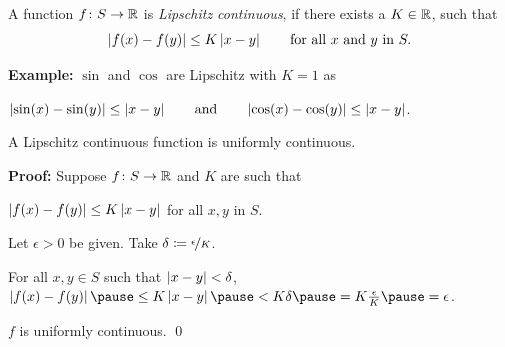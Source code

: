 \documentclass[10pt,aspectratio=169]{beamer}
\begin{document}
\begin{frame}

\begin{definition}
A function $f \colon S \to {\mathbb{R}}$
is \emph{Lipschitz continuous}, if there exists a $K \in {\mathbb{R}}$, such that
\begin{equation*}
\left\lvert {f(x)-f(y)} \right\rvert \leq K \left\lvert {x-y} \right\rvert 
\qquad \text{for all } x \text{ and } y \text{ in } S.
\end{equation*}
\end{definition}

\pause
\textbf{Example:} $\sin$ and $\cos$ are Lipschitz with $K=1$ as

$\left\lvert {\sin(x)-\sin(y)} \right\rvert \leq \left\lvert {x-y} \right\rvert \qquad \text{and} \qquad
\left\lvert {\cos(x)-\cos(y)} \right\rvert \leq \left\lvert {x-y} \right\rvert$.


\pause
\begin{proposition}
A Lipschitz continuous function is uniformly continuous.
\end{proposition}

\pause
\textbf{Proof:}
Suppose $f \colon S \to {\mathbb{R}}$ and $K$ are such that

$\left\lvert {f(x)-f(y)} \right\rvert \leq K \left\lvert {x-y} \right\rvert$ for all $x, y$ in $S$.

\pause
\medskip

Let $\epsilon > 0$ be given.
\pause
\quad
Take $\delta \coloneqq \nicefrac{\epsilon}{K}$.

\pause
\medskip

For all $x,y \in S$ such that
$\left\lvert {x-y} \right\rvert < \delta$,
\pause
\quad
$\abs{f(x)-f(y)}
\pause
\leq K \abs{x-y}
\pause
< K \delta
\pause
= K \frac{\epsilon}{K}
\pause
=
\epsilon$.

\pause
\medskip

\thus \quad $f$ is uniformly continuous.
\qed

\end{frame}
\end{document}
